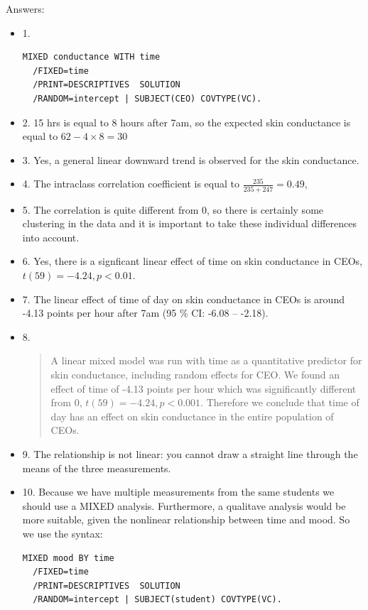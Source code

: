 \documentclass[]{report}\usepackage[]{graphicx}\usepackage[]{color}
\begin{document}
Answers:
\begin{itemize}
\item 1. \\
\begin{verbatim}
MIXED conductance WITH time
  /FIXED=time
  /PRINT=DESCRIPTIVES  SOLUTION
  /RANDOM=intercept | SUBJECT(CEO) COVTYPE(VC).
\end{verbatim}
\item 2. 15 hrs is equal to 8 hours after 7am, so the expected skin conductance is equal to $62 - 4 \times 8= 30$\\
\item 3. Yes, a general linear downward trend is observed for the skin conductance.
\item 4. The intraclass correlation coefficient is equal to $\frac{235}{235+247}=0.49$, 
\item 5. The correlation is quite different from 0, so there is certainly some clustering in the data and it is important to take these individual differences into account. \\
\item 6. Yes, there is a signficant linear effect of time on skin conductance in CEOs, $t(59)=-4.24, p < 0.01$.\\
\item 7. The linear effect of time of day on skin conductance in CEOs is around -4.13 points per hour after 7am (95 \% CI: -6.08 -- -2.18). \\
\item 8. \begin{quotation}
        A linear mixed model was run with time as a quantitative predictor for skin conductance, including random effects for CEO. We found an effect of time of -4.13 points per hour which was significantly different from 0, $t(59)=-4.24, p < 0.001$. Therefore we conclude that time of day has an effect on skin conductance in the entire population of CEOs.
        \end{quotation}
        
\item 9. The relationship is not linear: you cannot draw a straight line through the means of the three measurements. 
\item 10. Because we have multiple measurements from the same students we should use a MIXED analysis. Furthermore, a qualitave analysis would be more suitable, given the nonlinear relationship between time and mood. So we use the syntax:

\begin{verbatim}
MIXED mood BY time
  /FIXED=time
  /PRINT=DESCRIPTIVES  SOLUTION
  /RANDOM=intercept | SUBJECT(student) COVTYPE(VC).
\end{verbatim}

\end{itemize}
\end{document}
